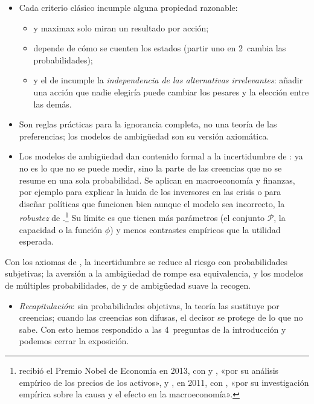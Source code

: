 \documentclass[11pt]{article}
\begin{document}
\begin{itemize}
\item Cada criterio clásico incumple alguna propiedad razonable\nocite{Milnor1954Games}:
  \begin{itemize}
  \item {} y maximax solo miran un resultado por acción;
  \item {} depende de cómo se cuenten los estados (partir uno en 2~cambia las probabilidades);
  \item y el de  incumple la \emph{independencia de las alternativas irrelevantes}: añadir una acción que nadie elegiría puede cambiar los pesares y la elección entre las demás.
  \end{itemize}
\item Son reglas prácticas para la ignorancia completa, no una teoría de las preferencias; los modelos de ambigüedad son su versión axiomática.
\item Los modelos de ambigüedad dan contenido formal a la incertidumbre de : ya no es lo que no se puede medir, sino la parte de las creencias que no se resume en una sola probabilidad. Se aplican en macroeconomía y finanzas, por ejemplo para explicar la huida de los inversores en las crisis o para diseñar políticas que funcionen bien aunque el modelo sea incorrecto, la \emph{robustez} de \textcite{HansenSargent2008Robustness}.\footnote{ recibió el Premio Nobel de Economía en 2013, con  y , «por su análisis empírico de los precios de los activos»\nocite{Nobel2013FamaHansenShiller}, y , en 2011, con , «por su investigación empírica sobre la causa y el efecto en la macroeconomía»\nocite{Nobel2011SargentSims}.} Su límite es que tienen más parámetros (el conjunto $\mathcal{P}$, la capacidad o la función $\phi$) y menos contrastes empíricos que la utilidad esperada.
\end{itemize}

\begin{ideaclave}
Con los axiomas de , la incertidumbre se reduce al riesgo con probabilidades subjetivas; la aversión a la ambigüedad de  rompe esa equivalencia, y los modelos de múltiples probabilidades, de  y de ambigüedad suave la recogen.
\end{ideaclave}

\begin{itemize}
\item \emph{Recapitulación}: sin probabilidades objetivas, la teoría las sustituye por creencias; cuando las creencias son difusas, el decisor se protege de lo que no sabe. Con esto hemos respondido a las 4~preguntas de la introducción y podemos cerrar la exposición.
\end{itemize}
\end{document}
